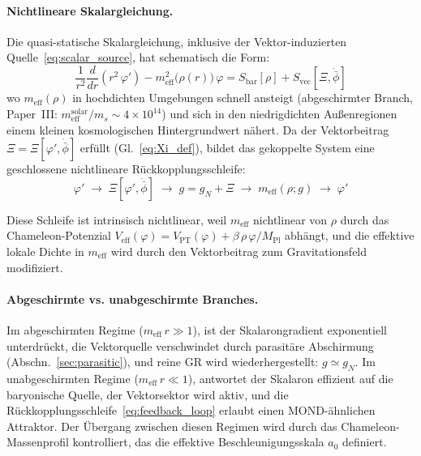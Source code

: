 \documentclass[aps,prd,twocolumn,superscriptaddress,nofootinbib]{revtex4-2}
\begin{document}
\paragraph{Nichtlineare Skalargleichung.}
Die quasi-statische Skalargleichung, inklusive der Vektor-induzierten Quelle~\eqref{eq:scalar_source}, hat schematisch die Form:
\begin{equation}
\frac{1}{r^2}\frac{d}{dr}\!\left(r^2\,\varphi'\right) - m_{\mathrm{eff}}^2\!\big(\rho(r)\big)\,\varphi = S_{\mathrm{bar}}[\rho] + S_{\mathrm{vec}}[\Xi, \dot{\bar{\phi}}]
\label{eq:scalar_chameleon}
\end{equation}
wo $m_{\mathrm{eff}}(\rho)$ in hochdichten Umgebungen schnell ansteigt (abgeschirmter Branch, Paper~III: $m_{\mathrm{eff}}^{\mathrm{solar}}/m_s \sim 4 \times 10^{14}$) und sich in den niedrigdichten Au\ss{}enregionen einem kleinen kosmologischen Hintergrundwert n\"ahert. Da der Vektorbeitrag $\Xi = \Xi[\varphi', \dot{\bar{\phi}}]$ erf\"ullt (Gl.~\ref{eq:Xi_def}), bildet das gekoppelte System eine geschlossene nichtlineare R\"uckkopplungsschleife:
\begin{equation}
\varphi' \;\longrightarrow\; \Xi[\varphi', \dot{\bar{\phi}}] \;\longrightarrow\; g = g_N + \Xi \;\longrightarrow\; m_{\mathrm{eff}}(\rho; g) \;\longrightarrow\; \varphi'
\label{eq:feedback_loop}
\end{equation}

Diese Schleife ist intrinsisch nichtlinear, weil $m_{\mathrm{eff}}$ nichtlinear von $\rho$ durch das Chameleon-Potenzial $V_{\mathrm{eff}}(\varphi) = V_{\mathrm{PT}}(\varphi) + \beta\,\rho\,\varphi/M_{\mathrm{Pl}}$ abh\"angt, und die effektive lokale Dichte in $m_{\mathrm{eff}}$ wird durch den Vektorbeitrag zum Gravitationsfeld modifiziert.

\paragraph{Abgeschirmte vs. unabgeschirmte Branches.}
Im abgeschirmten Regime ($m_{\mathrm{eff}}\,r \gg 1$), ist der Skalarongradient exponentiell unterdr\"uckt, die Vektorquelle verschwindet durch parasit\"are Abschirmung (Abschn.~\ref{sec:parasitic}), und reine GR wird wiederhergestellt: $g \simeq g_N$. Im unabgeschirmten Regime ($m_{\mathrm{eff}}\,r \ll 1$), antwortet der Skalaron effizient auf die baryonische Quelle, der Vektorsektor wird aktiv, und die R\"uckkopplungsschleife~\eqref{eq:feedback_loop} erlaubt einen MOND-\"ahnlichen Attraktor. Der \"Ubergang zwischen diesen Regimen wird durch das Chameleon-Massenprofil kontrolliert, das die effektive Beschleunigungsskala $a_0$ definiert.
\end{document}
